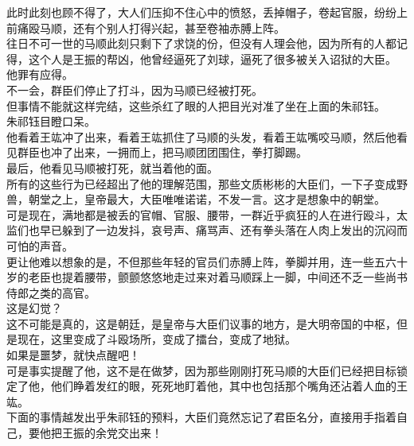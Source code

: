 \begin{multicols}{\theparacolNo}
此时此刻也顾不得了，大人们压抑不住心中的愤怒，丢掉帽子，卷起官服，纷纷上前痛殴马顺，还有个别人打得兴起，甚至卷袖赤膊上阵。\\

往日不可一世的马顺此刻只剩下了求饶的份，但没有人理会他，因为所有的人都记得，这个人是王振的帮凶，他曾经逼死了刘球，逼死了很多被关入诏狱的大臣。\\

他罪有应得。\\

不一会，群臣们停止了打斗，因为马顺已经被打死。\\

但事情不能就这样完结，这些杀红了眼的人把目光对准了坐在上面的朱祁钰。\\

朱祁钰目瞪口呆。\\

他看着王竑冲了出来，看着王竑抓住了马顺的头发，看着王竑嘴咬马顺，然后他看见群臣也冲了出来，一拥而上，把马顺团团围住，拳打脚踢。\\

最后，他看见马顺被打死，就当着他的面。\\

所有的这些行为已经超出了他的理解范围，那些文质彬彬的大臣们，一下子变成野兽，朝堂之上，皇帝最大，大臣唯唯诺诺，不发一言。这才是想象中的朝堂。\\

可是现在，满地都是被丢的官帽、官服、腰带，一群近乎疯狂的人在进行殴斗，太监们也早已躲到了一边发抖，哀号声、痛骂声、还有拳头落在人肉上发出的沉闷而可怕的声音。\\

更让他难以想象的是，不但那些年轻的官员们赤膊上阵，拳脚并用，连一些五六十岁的老臣也提着腰带，颤颤悠悠地走过来对着马顺踩上一脚，中间还不乏一些尚书侍郎之类的高官。\\

这是幻觉？\\

这不可能是真的，这是朝廷，是皇帝与大臣们议事的地方，是大明帝国的中枢，但是现在，这里变成了斗殴场所，变成了擂台，变成了地狱。\\

如果是噩梦，就快点醒吧！\\

可是事实提醒了他，这不是在做梦，因为那些刚刚打死马顺的大臣们已经把目标锁定了他，他们睁着发红的眼，死死地盯着他，其中也包括那个嘴角还沾着人血的王竑。\\

下面的事情越发出乎朱祁钰的预料，大臣们竟然忘记了君臣名分，直接用手指着自己，要他把王振的余党交出来！\\


\end{multicols}
